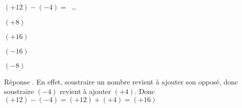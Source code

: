 \begin{exercice}
    $(+12)-(-4)=$~\ldots
    \begin{ChoixQCM}{4}
        \item $(+8)$
        \item $(+16)$
        \item $(-16)$
        \item $(-8)$
    \end{ChoixQCM}
\end{exercice}
\begin{corrige}
    Réponse . En effet, soustraire un nombre revient à ajouter son opposé, donc soustraire $(-4)$ revient à ajouter $(+4)$.
    Donc $(+12)-(-4)=(+12)+(+4)=(+16)$
\end{corrige}